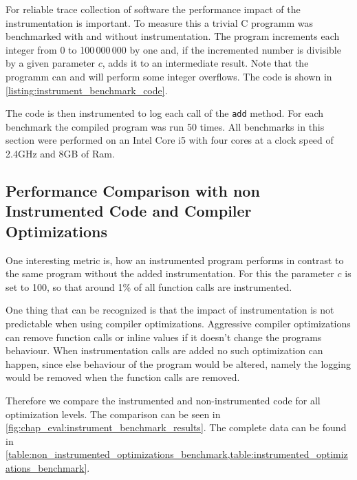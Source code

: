 For reliable trace collection of software the performance impact of the instrumentation is important.
To measure this a trivial C programm was benchmarked with and without instrumentation.
The program increments each integer from 0 to 100\,000\,000 by one and, if the incremented number is divisible by a given parameter \(c\), adds it to an intermediate result.
Note that the programm  can and will perform some integer overflows.
The code is shown in \cref{listing:instrument_benchmark_code}.

\begin{figure}

\end{figure}

The code is then instrumented to log each call of the \lstinline{add} method.
For each benchmark the compiled program was run 50 times.
All benchmarks in this section were performed on an Intel Core i5 with four cores at a clock speed of 2.4GHz and 8GB of Ram.

\subsection{Performance Comparison with non Instrumented Code and Compiler Optimizations}
\label{sec:evaluation:instrumentation_benchmark:instr_vs_non_inst}

One interesting metric is, how an instrumented program performs in contrast to the same program without the added instrumentation.
For this the parameter \(c\) is set to 100, so that around 1\% of all function calls are instrumented.

One thing that can be recognized is that the impact of instrumentation is not predictable when using compiler optimizations.
Aggressive compiler optimizations can remove function calls or inline values if it doesn't change the programs behaviour.
When instrumentation calls are added no such optimization can happen, since else behaviour of the program would be altered, namely the logging would be removed when the function calls are removed.

Therefore we compare the instrumented and non-instrumented code for all optimization levels.
The comparison can be seen in \cref{fig:chap_eval:instrument_benchmark_results}.
The complete data can be found in \cref{table:non_instrumented_optimizations_benchmark,table:instrumented_optimizations_benchmark}.

